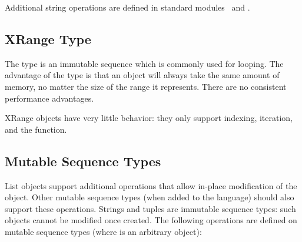 Additional string operations are defined in standard modules
\ and
.


\subsection{XRange Type \label{typesseq-xrange}}

The  type is an immutable sequence which
is commonly used for looping.  The advantage of the 
type is that an  object will always take the same amount
of memory, no matter the size of the range it represents.  There are
no consistent performance advantages.

XRange objects have very little behavior: they only support indexing,
iteration, and the  function.


\subsection{Mutable Sequence Types \label{typesseq-mutable}}

List objects support additional operations that allow in-place
modification of the object.
Other mutable sequence types (when added to the language) should
also support these operations.
Strings and tuples are immutable sequence types: such objects cannot
be modified once created.
The following operations are defined on mutable sequence types (where
 is an arbitrary object):

